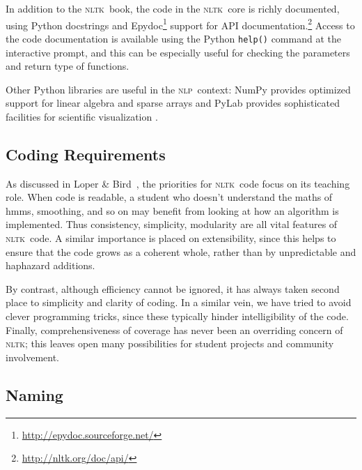 \documentclass[11pt]{article}
\newcommand{\NLP}{\textsc{nlp}}
\newcommand{\NLTK}{\textsc{nltk}}
\newcommand{\code}[1]{\texttt{\small #1}}
\begin{document}
In addition to the \NLTK\ book, the code in the \NLTK\ core is richly
documented, using Python docstrings and
Epydoc\footnote{\url{http://epydoc.sourceforge.net/}} support
for API documentation.\footnote{\url{http://nltk.org/doc/api/}} Access
to the code documentation is available using the Python \code{help()}
command at the interactive prompt, and this can be especially useful
for checking the parameters and return type of functions.

Other Python libraries are useful in the \NLP\ context: NumPy
provides optimized support for linear algebra and sparse
arrays \cite{numpy} and PyLab provides
sophisticated facilities for scientific
visualization \cite{matplotlib}.

\subsection{Coding Requirements}

As discussed in Loper \& Bird~, the priorities for \NLTK\ code
focus on its teaching role. When code is readable, a student who
doesn't understand the maths of {\sc hmm}s, smoothing, and so on may benefit
from looking at how an algorithm is implemented. Thus consistency,
simplicity, modularity are all vital features of \NLTK\ code. A
similar importance is placed on extensibility, since this helps to
ensure that the code grows as a coherent whole, rather than by
unpredictable and haphazard additions.  

By contrast, although efficiency cannot be ignored, it has
always taken second place to simplicity and clarity of coding. In a
similar vein, we have tried to avoid clever programming tricks,
since these typically hinder intelligibility of the code.  Finally,
comprehensiveness of coverage has never been an overriding concern of
\NLTK; this leaves open many possibilities for student projects and
community involvement.


\subsection{Naming}
\end{document}
